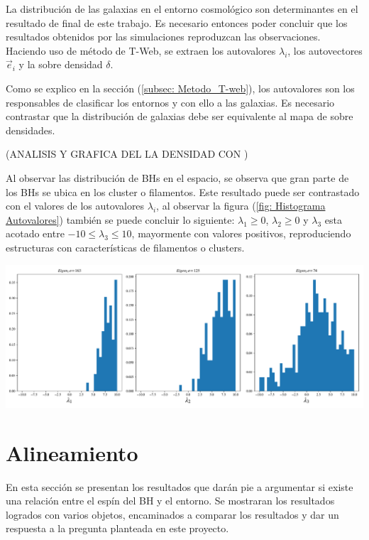 La distribución de las galaxias en el entorno cosmológico son determinantes en el resultado de final de este trabajo. Es necesario entonces poder concluir que los resultados obtenidos por las simulaciones reproduzcan las observaciones. Haciendo uso de método de T-Web, se extraen los autovalores $\lambda_{i}$, los autovectores $\vec{e}_{i}$ y la sobre densidad $\delta$. 

Como se explico en la sección (\ref{subsec: Metodo_T-web}),  los autovalores son los responsables de clasificar los entornos y con ello a las galaxias. Es necesario contrastar que la distribución de galaxias debe ser equivalente al mapa de sobre densidades. 

(ANALISIS Y GRAFICA DEL LA DENSIDAD CON )

Al observar las distribución de BHs en el espacio, se observa que gran parte de los BHs se ubica en los cluster o filamentos. Este resultado puede ser contrastado con el valores de los autovalores $\lambda_{i}$, al observar la figura (\ref{fig: Histograma Autovalores}) también se puede concluir lo siguiente:  $\lambda_{1}\geq 0$,  $\lambda_{2}\geq 0$ y $\lambda_{3}$ esta acotado entre $-10 \leq \lambda_{3}\leq 10$, mayormente con valores positivos, reproduciendo estructuras con características de filamentos o clusters. 
%
\begin{center}
\includegraphics[scale=.38]{./figures/6_Resultados/cosmo01/histograma_autovalores2.pdf}
\label{fig: Histograma Autovalores}
\end{center}
%




\section{ Alineamiento}
\label{sec: Alineamiento}

En esta sección se presentan los resultados que darán pie a argumentar si existe una relación entre el espín del BH y el entorno. Se mostraran los resultados logrados con varios objetos, encaminados a comparar los resultados y dar un respuesta a la pregunta planteada en este proyecto.







